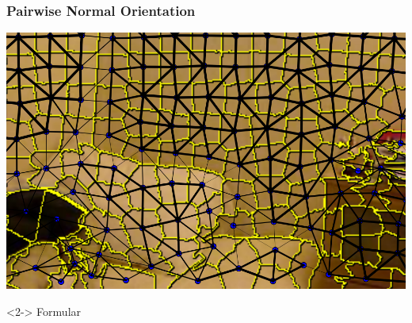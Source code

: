 \documentclass[final,ignorenonframetext,compress]{beamer}
\begin{document}
    \begin{frame}
        \frametitle{Pairwise Normal Orientation}
        \begin{center}
            \includegraphics[width=\linewidth]{images/normal_feature}
        \end{center}
        \begin{visibleenv}<2->
            Formular %
        \end{visibleenv}
    \end{frame}
\end{document}
